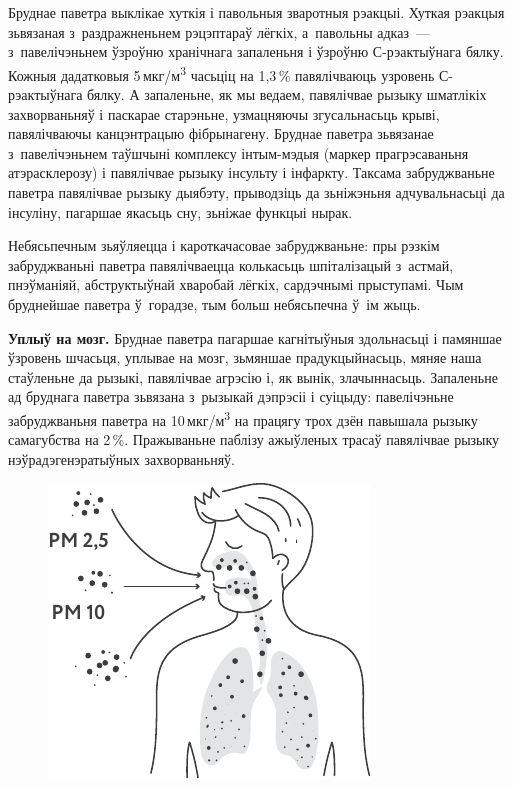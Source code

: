 
Бруднае паветра выклікае хуткія і павольныя зваротныя рэакцыі. Хуткая рэакцыя зьвязаная з~раздражненьнем рэцэптараў лёгкіх, а~павольны адказ~--- з~павелічэньнем ўзроўню хранічнага запаленьня і ўзроўню С-рэактыўнага бялку. Кожныя дадатковыя 5\,мкг/м\textsuperscript{3} часьціц на 1,3\,\% павялічваюць узровень С-рэактыўнага бялку. А запаленьне, як мы ведаем, павялічвае рызыку шматлікіх захворваньняў і паскарае старэньне, узмацняючы згусальнасьць крыві, павялічваючы канцэнтрацыю фібрынагену. Бруднае паветра зьвязанае з~павелічэньнем таўшчыні комплексу інтым-мэдыя (маркер прагрэсаваньня атэрасклерозу) і павялічвае рызыку інсульту і інфаркту. Таксама забруджваньне паветра павялічвае рызыку дыябэту, прыводзіць да зьніжэньня адчувальнасьці да інсуліну, пагаршае якасьць сну, зьніжае функцыі нырак.

Небясьпечным зьяўляецца і кароткачасовае забруджваньне: пры рэзкім забруджваньні паветра павялічваецца колькасьць шпіталізацый з~астмай, пнэўманіяй, абструктыўнай хваробай лёгкіх, сардэчнымі прыступамі. Чым бруднейшае паветра ў~горадзе, тым больш небясьпечна ў~ім жыць.

\textbf{Уплыў на мозг.} Бруднае паветра пагаршае кагнітыўныя здольнасьці і памяншае ўзровень шчасьця, уплывае на мозг, зьмяншае прадукцыйнасьць, мяняе наша стаўленьне да рызыкі, павялічвае агрэсію і, як вынік, злачыннасьць. Запаленьне ад бруднага паветра зьвязана з~рызыкай дэпрэсіі і суіцыду: павелічэньне забруджваньня паветра на 10\,мкг/м\textsuperscript{3} на працягу трох дзён павышала рызыку самагубства на 2\,\%. Пражываньне паблізу ажыўленых трасаў павялічвае рызыку нэўрадэгенэратыўных захворваньняў.


\begin{figure}[htb!]
  \centering
  \includegraphics[scale=1.3]{willpower/ch11/3.pdf}
\end{figure}

